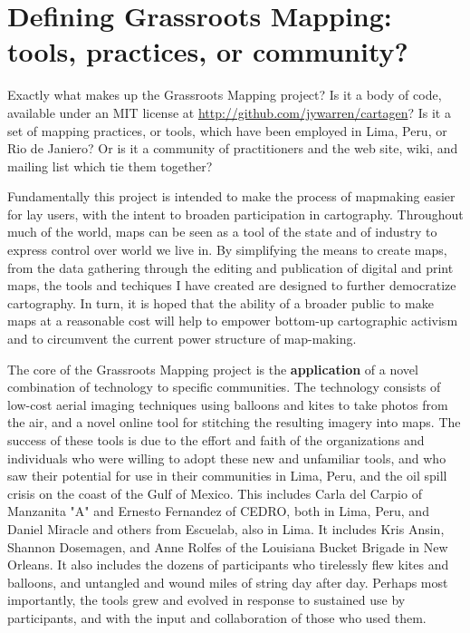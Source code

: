 \documentclass[11pt,oneside,notitlepage]{report}
\begin{document}
\section{Defining Grassroots Mapping: tools, practices, or community?}

Exactly what makes up the Grassroots Mapping project? Is it a body of code, available under an MIT license at \url{http://github.com/jywarren/cartagen}? Is it a set of mapping practices, or tools, which have been employed in Lima, Peru, or Rio de Janiero? Or is it a community of practitioners and the web site, wiki, and mailing list which tie them together?

Fundamentally this project is intended to make the process of mapmaking easier for lay users, with the intent to broaden participation in cartography. Throughout much of the world, maps can be seen as a tool of the state and of industry to express control over world we live in. By simplifying the means to create maps, from the data gathering through the editing and publication of digital and print maps, the tools and techiques I have created are designed to further democratize cartography. In turn, it is hoped that the ability of a broader public to make maps at a reasonable cost will help to empower bottom-up cartographic activism and to circumvent the current power structure of map-making. 

The core of the Grassroots Mapping project is the \textbf{application} of a novel combination of technology to specific communities. The technology consists of low-cost aerial imaging techniques using balloons and kites to take photos from the air, and a novel online tool for stitching the resulting imagery into maps. The success of these tools is due to the effort and faith of the organizations and individuals who were willing to adopt these new and unfamiliar tools, and who saw their potential for use in their communities in Lima, Peru, and the oil spill crisis on the coast of the Gulf of Mexico. This includes Carla del Carpio of Manzanita "A" and Ernesto Fernandez of CEDRO, both in Lima, Peru, and Daniel Miracle and others from Escuelab, also in Lima. It includes Kris Ansin, Shannon Dosemagen, and Anne Rolfes of the Louisiana Bucket Brigade in New Orleans. It also includes the dozens of participants who tirelessly flew kites and balloons, and untangled and wound miles of string day after day. Perhaps most importantly, the tools grew and evolved in response to sustained use by participants, and with the input and collaboration of those who used them.
\end{document}
